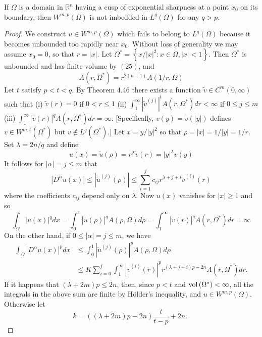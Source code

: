 \begin{theorem}
  If $\Omega$ is a domain in $\mathbb{R}^n$ having a cusp of exponential sharpness at a point $x_0$ on its boundary, then $W^{m,p}(\Omega)$ is not imbedded in $L^q(\Omega)$ for any $q>p$.
\end{theorem}

\begin{proof}
  We construct $u \in W^{m,p}(\Omega)$ which fails to belong to $L^q(\Omega)$ because
  it becomes unbounded too rapidly near $x_0$. Without loss of generality we may assume $x_0=0$, 
  so that $r=|x|$. Let $\Omega^*=\left\{x /|x|^2: x \in \Omega,|x|<1\right\}$.
  Then $\Omega^*$ is unbounded and has finite volume by $(25)$, and
  \[
  A\left(r, \Omega^*\right)=r^{2(n-1)} A(1 / r, \Omega)
  \]
  Let $t$ satisfy $p<t<q$. By Theorem 4.46 there exists a
  function $\tilde{v} \in C^m(0, \infty)$ such that
  (i) $\tilde{v}(r)=0$ if $0<r \leq 1$
  (ii) $\int_1^{\infty}\left|\tilde{v}^{(j)}\right|^t A\left(r, \Omega^*\right) d r<\infty$ if $0 \leq j \leq m$
  (iii) $\int_1^{\infty}|\tilde{v}(r)|^q A\left(r, \Omega^*\right) d r=\infty$.
  [Specifically, $v(y)=\tilde{v}(|y|)$ defines $v \in W^{m, t}\left(\Omega^*\right)$ but $v \notin L^q\left(\Omega^*\right)$.] Let $x=y /|y|^2$ so that $\rho=|x|=1 /|y|=1 / r$. Set $\lambda=2 n / q$ and define
  \[
  u(x)=\tilde{u}(\rho)=r^\lambda \tilde{v}(r)=|y|^\lambda v(y)
  \]
  It follows for $|\alpha|=j \leq m$ that
  \[
  \left|D^\alpha u(x)\right| \leq\left|\tilde{u}^{(j)}(\rho)\right| \leq \sum_{i=1}^j c_{i j} r^{\lambda+j+i} \tilde{v}^{(i)}(r)
  \]
  where the coefficients $c_{i j}$ depend only on $\lambda$. Now $u(x)$ vanishes for $|x| \geq 1$ and so
  \[
  \int_{\Omega}|u(x)|^q d x=\int_0^1|\tilde{u}(\rho)|^q A(\rho, \Omega) d \rho=\int_1^{\infty}|\tilde{v}(r)|^q A\left(r, \Omega^*\right) d r=\infty
  \]
  On the other hand, if $0 \leq|\alpha|=j \leq m$, we have
  \[
  \begin{aligned}
  \int_{\Omega}\left|D^\alpha u(x)\right|^p d x & \leq \int_0^1\left|\tilde{u}^{(j)}(\rho)\right|^p A(\rho, \Omega) d \rho \\
  & \leq K \sum_{i=0}^j \int_1^{\infty}\left|\tilde{v}^{(i)}(r)\right|^p r^{(\lambda+j+i) p-2 n} A\left(r, \Omega^*\right) d r .
  \end{aligned}
  \]
  If it happens that $(\lambda+2 m) p \leq 2 n$, then, since $p<t$ and $\operatorname{vol}\left(\Omega^*\right)<\infty$, all the integrals in the above sum are finite by Hölder's inequality, and $u \in W^{m,p}(\Omega)$. Otherwise let
  \[
  k=((\lambda+2 m) p-2 n) \frac{t}{t-p}+2 n \text {. }
\]
\end{proof}
